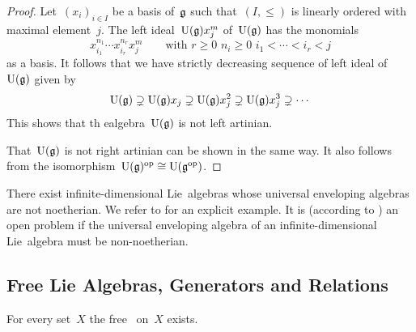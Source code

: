 \begin{proof}
  Let~$(x_i)_{i \in I}$ be a basis of~$\mathfrak{g}$ such that~$(I, \leq)$ is linearly ordered with maximal element~$j$.
  The left ideal~$\operatorname{U}(\mathfrak{g}) x_j^m$ of~$\operatorname{U}(\mathfrak{g})$ has the monomials
  \[
    x_{i_1}^{n_1} \dotsm x_{i_r}^{n_r} x_j^m
    \qquad
    \text{with~$r \geq 0$~$n_i \geq 0$~$i_1 < \dotsb < i_r < j$}
  \]
  as a basis.
  It follows that we have strictly decreasing sequence of left ideal of~$\operatorname{U}(\mathfrak{g})$ given by
  \[
    \operatorname{U}(\mathfrak{g})
    \supsetneq
    \operatorname{U}(\mathfrak{g}) x_j
    \supsetneq
    \operatorname{U}(\mathfrak{g}) x_j^2
    \supsetneq
    \operatorname{U}(\mathfrak{g}) x_j^3
    \supsetneq
    \dotsb
  \]
  This shows that th ealgebra~$\operatorname{U}(\mathfrak{g})$ is not left artinian.

  That~$\operatorname{U}(\mathfrak{g})$ is not right artinian can be shown in the same way.
  It also follows from the isomorphism~$\operatorname{U}(\mathfrak{g})^{\mathrm{op}} \cong \operatorname{U}(\mathfrak{g}^{\mathrm{op}})$.
\end{proof}


\begin{remark}
  There exist infinite-dimensional Lie~algebras whose universal enveloping algebras are not noetherian.
  We refer to \cite{uea_of_witt_algebra_not_noetherian} for an explicit example.
  It is (according to \cite[p.\ xix]{introduction_to_noncommutative_noetherian}) an open problem if the universal enveloping algebra of an infinite-dimensional Lie~algebra must be non-noetherian.
\end{remark}



\subsection*{Free Lie Algebras, Generators and Relations}

\begin{proposition}
  \label{existence of free lie algebras}
  For every set~$X$ the free~{\liealgebra{$\kf$}} on~$X$ exists.
\end{proposition}


